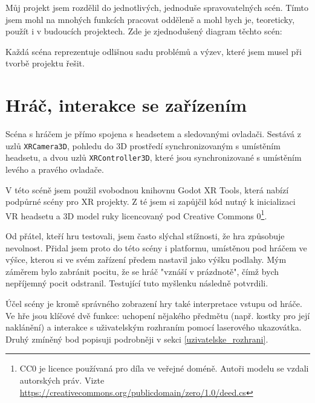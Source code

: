 \begin{samepage}
  Můj projekt jsem rozdělil do jednotlivých, jednoduše spravovatelných scén. Tímto jsem mohl na mnohých funkcích pracovat odděleně a mohl bych je, teoreticky, použít i v budoucích projektech. Zde je zjednodušený diagram těchto scén:

  \vspace{0.3cm}
  \renewcommand\DTstyle{\rmfamily}

  Každá scéna reprezentuje odlišnou sadu problémů a výzev, které jsem musel při tvorbě projektu řešit.
\end{samepage}

\section{Hráč, interakce se zařízením}

Scéna s hráčem je přímo spojena s headsetem a sledovanými ovladači. Sestává z uzlů \texttt{XRCamera3D}, pohledu do 3D prostředí synchronizovaným s umístěním headsetu, a dvou uzlů \texttt{XRController3D}, které jsou synchronizované s umístěním levého a pravého ovladače.

V této scéně jsem použil svobodnou knihovnu Godot XR Tools, která nabízí podpůrné scény pro XR projekty. Z té jsem si zapůjčil kód nutný k inicializaci VR headsetu a 3D model ruky licencovaný pod Creative Commons 0\footnote{CC0 je licence používaná pro díla ve veřejné doméně. Autoři modelu se vzdali autorských práv. Vizte \url{https://creativecommons.org/publicdomain/zero/1.0/deed.cs}}.

Od přátel, kteří hru testovali, jsem často slýchal stížnosti, že hra způsobuje nevolnost. Přidal jsem proto do této scény i platformu, umístěnou pod hráčem ve výšce, kterou si ve svém zařízení předem nastavil jako výšku podlahy. Mým záměrem bylo zabránit pocitu, že se hráč "vznáší v prázdnotě", čímž bych nepříjemný pocit odstranil. Testující tuto myšlenku následně potvrdili.

Účel scény je kromě správného zobrazení hry také interpretace vstupu od hráče. Ve hře jsou klíčové dvě funkce: uchopení nějakého předmětu (např. kostky pro její naklánění) a interakce s uživatelským rozhraním pomocí laserového ukazovátka. Druhý zmíněný bod popisuji podrobněji v sekci \ref{uzivatelske_rozhrani}.

